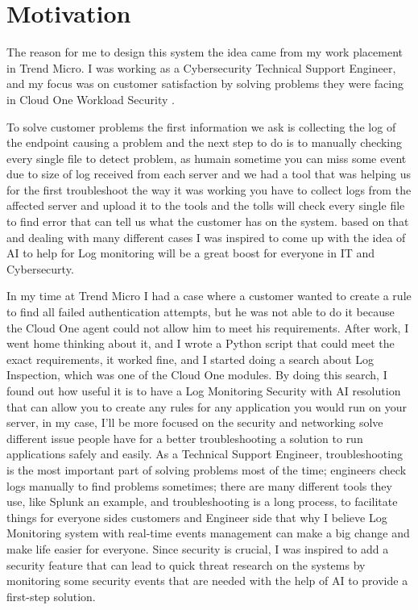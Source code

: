  

 


\section{Motivation}

The reason for me to design this system the idea came from my work placement in Trend Micro. I was working as a Cybersecurity Technical Support Engineer, and my focus was on customer satisfaction by solving problems they were facing in Cloud One Workload Security \cite{trendmicro_business}. 



To solve customer problems the first information we ask is collecting the log of the endpoint causing a problem and the next step to do is to manually checking every single file to detect problem, as humain sometime you can miss some event due to size of log received from each server and we had a tool that was helping us for the first troubleshoot the way it was working you have to collect logs from the affected server and upload it to the tools and the tolls will check every single file to find error that can tell us what the customer has on the system. based on that  and dealing with many different cases I was inspired to come up with the idea of AI to help for Log monitoring will be a great boost for everyone in IT and Cybersecurty\cite{stanciu2013importance}.

In my time at Trend Micro I had a case where a customer wanted to create a rule to find all failed authentication attempts, but he was not able to do it because the Cloud One agent could not allow him to meet his requirements. After work, I went home thinking about it, and I wrote a Python script that could meet the exact requirements, it worked fine, and I started doing a search about Log Inspection, which was one of the Cloud One modules. By doing this search, I found out how useful it is to have a Log Monitoring Security with AI resolution that can allow you to create any rules for any application you would run on your server, in my case, I’ll be more focused on the security and networking solve different issue people have for a better troubleshooting a solution to run applications safely and easily\cite{hassani2018studying}. As a Technical Support Engineer, troubleshooting is the most important part of solving problems most of the time; engineers check logs manually to find problems sometimes; there are many different tools they use, like Splunk an example, and troubleshooting is a long process, to facilitate things for everyone sides customers and Engineer side that why I believe Log Monitoring system with real-time events management can make a big change and make life easier for everyone. Since security is crucial, I was inspired to add a security feature that can lead to quick threat research on the systems by monitoring some security events that are needed with the help of AI to provide a first-step solution\cite{chainourov2017log}. 


